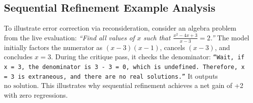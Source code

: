 \documentclass{article}
\begin{document}
\begin{table}[h]
\centering
\caption{Development grid sweep for adaptive controllers on MathVista (200 development questions). Constraint: Dev Accuracy $\ge \text{Fixed-32 SC} - 1.0\text{ pp}$ ($63.80\% - 1.0\% = 62.80\%$).}
\label{tab:app_sweep_mathvista}
\end{table}

\subsection{Sequential Refinement Example Analysis}
To illustrate error correction via reconsideration, consider an algebra problem from the live evaluation: \textit{``Find all values of $x$ such that $\frac{x^2 - 4x + 3}{x - 3} = 2$.''} The model initially factors the numerator as $(x - 3)(x - 1)$, cancels $(x - 3)$, and concludes $x = 3$. During the critique pass, it checks the denominator: \texttt{``Wait, if $x = 3$, the denominator is $3 - 3 = 0$, which is undefined. Therefore, $x = 3$ is extraneous, and there are no real solutions.''} It outputs $\boxed{\text{no solution}}$. This illustrates why sequential refinement achieves a net gain of +2 with zero regressions.
\end{document}
